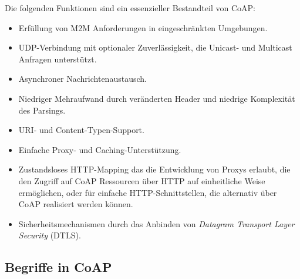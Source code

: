 Die folgenden Funktionen sind ein essenzieller Bestandteil von CoAP:
\begin{itemize}
    \item Erfüllung von M2M Anforderungen in eingeschränkten Umgebungen.
    \item UDP-Verbindung mit optionaler Zuverlässigkeit, die Unicast- und Multicast Anfragen unterstützt.
    \item Asynchroner Nachrichtenaustausch.
    \item Niedriger Mehraufwand durch veränderten Header und niedrige Komplexität des Parsings.
    \item URI- und Content-Typen-Support.
    \item Einfache Proxy- und Caching-Unterstützung.
    \item Zustandsloses HTTP-Mapping das die Entwicklung von Proxys erlaubt, die den Zugriff auf CoAP Ressourcen über HTTP auf einheitliche Weise ermöglichen, oder für einfache HTTP-Schnittstellen, die alternativ über CoAP realisiert werden können.
    \item Sicherheitsmechanismen durch das Anbinden von \textit{Datagram Transport Layer Security} (DTLS).
\end{itemize}

\subsection{Begriffe in CoAP}
\label{subsec:begiffe-in-coap}

